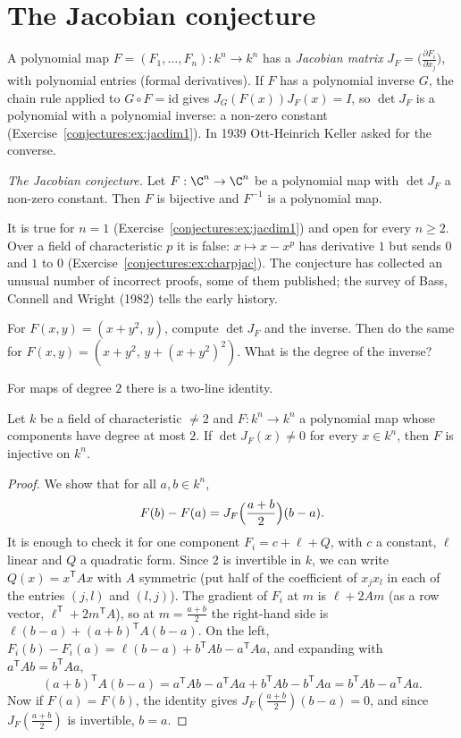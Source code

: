 \section{The Jacobian conjecture}

A polynomial map $F=(F_1,\dots,F_n):k^n\to k^n$ has a \emph{Jacobian matrix} $J_F=\bigl(\frac{\partial F_i}{\partial x_j}\bigr)$, with polynomial
entries (formal derivatives). If $F$ has a polynomial inverse $G$, the chain rule applied to $G\circ F=\mathrm{id}$ gives $J_G(F(x))J_F(x)=I$, so
$\det J_F$ is a polynomial with a polynomial inverse: a non-zero constant (Exercise~\ref{conjectures:ex:jacdim1}). In 1939 Ott-Heinrich Keller asked for the converse.

\begin{center}
\emph{The Jacobian conjecture.} Let $F:\C^n\to\C^n$ be a polynomial map with $\det J_F$ a non-zero constant. Then $F$ is bijective and $F^{-1}$ is a
polynomial map.
\end{center}

It is true for $n=1$ (Exercise~\ref{conjectures:ex:jacdim1}) and open for every $n\ge2$. Over a field of characteristic $p$ it is false: $x\mapsto x-x^p$ has derivative
$1$ but sends $0$ and $1$ to $0$ (Exercise~\ref{conjectures:ex:charpjac}). The conjecture has collected an unusual number of incorrect proofs, some of them published;
the survey of Bass, Connell and Wright (1982) tells the early history.

\begin{think}
For $F(x,y)=(x+y^2,\,y)$, compute $\det J_F$ and the inverse. Then do the same for $F(x,y)=(x+y^2,\,y+(x+y^2)^2)$. What is the degree of the inverse?
\end{think}

For maps of degree $2$ there is a two-line identity.

\begin{theorem}[Wang, 1980]\label{conjectures:thm:wang}
Let $k$ be a field of characteristic $\ne2$ and $F:k^n\to k^n$ a polynomial map whose components have degree at most $2$. If $\det J_F(x)\ne0$ for every
$x\in k^n$, then $F$ is injective on $k^n$.
\end{theorem}
\begin{proof}
We show that for all $a,b\in k^n$,
\[
F(b)-F(a)=J_F\Bigl(\frac{a+b}2\Bigr)(b-a).
\]
It is enough to check it for one component $F_i=c+\ell+Q$, with $c$ a constant, $\ell$ linear and $Q$ a quadratic form. Since $2$ is invertible in $k$, we can
write $Q(x)=x^{\mathsf T}Ax$ with $A$ symmetric (put half of the coefficient of $x_jx_l$ in each of the entries $(j,l)$ and $(l,j)$). The gradient of $F_i$
at $m$ is $\ell+2Am$ (as a row vector, $\ell^{\mathsf T}+2m^{\mathsf T}A$), so at $m=\frac{a+b}2$ the right-hand side is $\ell(b-a)+(a+b)^{\mathsf T}A(b-a)$.
On the left, $F_i(b)-F_i(a)=\ell(b-a)+b^{\mathsf T}Ab-a^{\mathsf T}Aa$, and expanding with $a^{\mathsf T}Ab=b^{\mathsf T}Aa$,
\[
(a+b)^{\mathsf T}A(b-a)=a^{\mathsf T}Ab-a^{\mathsf T}Aa+b^{\mathsf T}Ab-b^{\mathsf T}Aa=b^{\mathsf T}Ab-a^{\mathsf T}Aa.
\]
Now if $F(a)=F(b)$, the identity gives $J_F(\frac{a+b}2)(b-a)=0$, and since $J_F(\frac{a+b}2)$ is invertible, $b=a$.
\end{proof}

